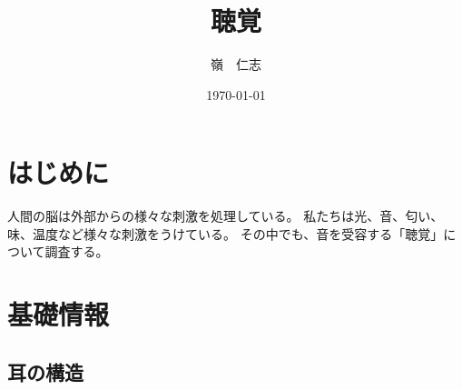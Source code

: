 \documentclass[15pt]{jarticle}
\title{聴覚}
\author{嶺　仁志}
\date{\today}
\begin{document}
\maketitle
\section{はじめに}
\label{intro}
人間の脳は外部からの様々な刺激を処理している。
私たちは光、音、匂い、味、温度など様々な刺激をうけている。
その中でも、音を受容する「聴覚」について調査する。
\section{基礎情報}
\label{basic}

\subsection{耳の構造}
\label{Structure of the ear}



\end{document}

